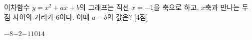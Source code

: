 이차함수 $y=x^2+ax+b$의 그래프는 직선 $x=-1$을 축으로 하고, $x$축과 만나는 두 점 사이의 거리가 $6$이다. 이때 $a-b$의 값은?  \mbox{[4점]}
\begin{choices32}{$-8$}{$-2$}{$-1$}{$10$}{$14$}\end{choices32}
